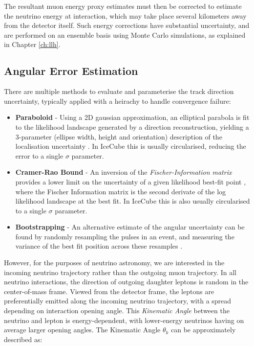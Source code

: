 The resultant muon energy proxy estimates must then be corrected to estimate the neutrino energy at interaction, which may take place several kilometers away from the detector itself. Such energy corrections have substantial uncertainty, and are performed on an ensemble basis using Monte Carlo simulations, as explained in Chapter \ref{ch:llh}.
 
\subsection*{Angular Error Estimation}

There are multiple methods to evaluate and parameterise the track direction uncertainty, typically applied with a heirachy to handle convergence failure:

\begin{itemize}
	\item \textbf{Paraboloid} - Using a 2D gaussian approximation, an elliptical parabola is fit to the likelihood landscape generated by a direction reconstruction, yielding a 3-parameter (ellipse width, height and orientation) description of the localisation uncertainty . In IceCube this is usually circularised, reducing the error to a single $\sigma$ parameter. 
	\item \textbf{Cramer-Rao Bound} - An inversion of the \emph{Fischer-Information matrix} provides a lower limit on the uncertainty of a given likelihood best-fit point , where the Fischer Information matrix is the second derivate of the log likelihood landscape at the best fit.  In IceCube this is also usually circularised to a single $\sigma$ parameter. 
	\item \textbf{Bootstrapping} - An alternative estimate of the angular uncertainty can be found by randomly resampling the pulses in an event, and measuring the variance of the best fit position across these resamples \cite{kintscher_thesis}.
\end{itemize}
 
However, for the purposes of neutrino astronomy, we are interested in the incoming neutrino trajectory rather than the outgoing muon trajectory. In all neutrino interactions, the direction of outgoing daughter leptons is random in the center-of-mass frame. Viewed from the detector frame, the leptons are preferentially emitted along the incoming neutrino trajectory, with a spread depending on interaction opening angle. This \emph{Kinematic Angle} between the neutrino and lepton is energy-dependent, with lower-energy neutrinos having on average larger opening angles. The Kinematic Angle $\theta_{k} $ can be approximately  described as:

